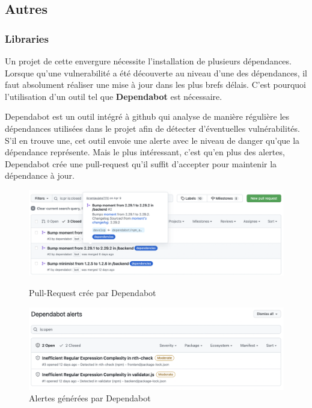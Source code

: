 \subsection{Autres}
\subsubsection{Libraries}

Un projet de cette envergure nécessite l'installation de plusieurs dépendances. Lorsque qu'une vulnerabilité a été découverte au niveau d'une des dépendances, il faut absolument réaliser une mise à jour dans les plus brefs délais.
C'est pourquoi l'utilisation d'un outil tel que \textbf{Dependabot} est nécessaire.

Dependabot est un outil intégré à github qui analyse de manière régulière les dépendances utilisées dans le projet afin de détecter d'éventuelles vulnérabilités. S'il en trouve une, cet outil envoie une alerte avec le niveau de danger qu'que la dépendance représente. Mais le plus intéressant, c'est qu'en plus des alertes, Dependabot crée une pull-request qu'il suffit d'accepter pour maintenir la dépendance à jour.



  \begin{figure}[H]
    \begin{minipage}[b]{0.5\linewidth}
    \centering
    \includegraphics[width=1\linewidth]{img/depe.png}
    \caption{Pull-Request crée par Dependabot}
    \label{fig:figura1}
    \end{minipage}
    \hspace{0.3cm}
    \begin{minipage}[b]{0.5\linewidth}
    \centering
    \includegraphics[width=1\linewidth]{img/alerts.png}
    \caption{Alertes générées par Dependabot}
    \label{fig:figura2}
    \end{minipage}
    \end{figure}





